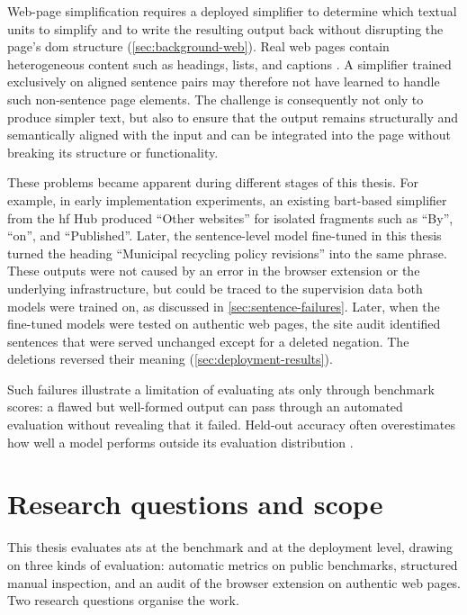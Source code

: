 \pagebreak

Web-page simplification requires a deployed simplifier to determine which textual units to simplify and to write the resulting output back without disrupting the page's \gls{dom} structure (\cref{sec:background-web}).
Real web pages contain heterogeneous content such as headings, lists, and captions \parencite[518--519]{hellbusch2018webdesign}.
A simplifier trained exclusively on aligned sentence pairs may therefore not have learned to handle such non-sentence page elements.
The challenge is consequently not only to produce simpler text, but also to ensure that the output remains structurally and semantically aligned with the input and can be integrated into the page without breaking its structure or functionality.

These problems became apparent during different stages of this thesis.
For example, in early implementation experiments, an existing \gls{bart}-based simplifier from the \gls{hf} Hub produced ``Other websites'' for isolated fragments such as ``By'', ``on'', and ``Published''.
Later, the sentence-level model fine-tuned in this thesis turned the heading ``Municipal recycling policy revisions'' into the same phrase.
These outputs were not caused by an error in the browser extension or the underlying infrastructure, but could be traced to the supervision data both models were trained on, as discussed in \cref{sec:sentence-failures}.
Later, when the fine-tuned models were tested on authentic web pages, the site audit identified sentences that were served unchanged except for a deleted negation.
The deletions reversed their meaning (\cref{sec:deployment-results}).

Such failures illustrate a limitation of evaluating \gls{ats} only through benchmark scores: a flawed but well-formed output can pass through an automated evaluation without revealing that it failed.
Held-out accuracy often overestimates how well a model performs outside its evaluation distribution \parencite[4902]{ribeiro-etal-2020-beyond}.

\section{Research questions and scope}
\label{sec:research-questions}

This thesis evaluates \gls{ats} at the benchmark and at the deployment level, drawing on three kinds of evaluation: automatic metrics on public benchmarks, structured manual inspection, and an audit of the browser extension on authentic web pages.
Two research questions organise the work.

